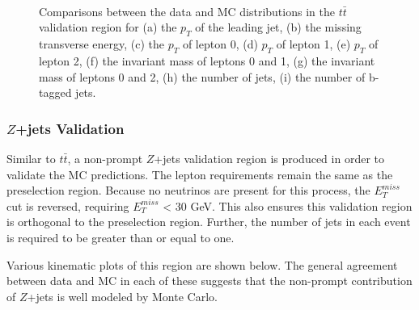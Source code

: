 \begin{figure}[H]
    \centering
    \\
    \\
    \\
    \caption{Comparisons between the data and MC distributions in the $t\bar{t}$ validation region for (a) the $p_T$ of the leading jet, (b) the missing transverse energy, (c) the $p_T$ of lepton 0, (d) $p_T$ of lepton 1, (e) $p_T$ of lepton 2, (f) the invariant mass of leptons 0 and 1, (g) the invariant mass of leptons 0 and 2, (h) the number of jets, (i) the number of b-tagged jets.}
    \label{ttbar_kinematics}
\end{figure}

\subsubsection{$Z$+jets Validation}

Similar to $t\bar{t}$, a non-prompt $Z$+jets validation region is produced in order to validate the MC predictions. The lepton requirements remain the same as the preselection region. Because no neutrinos are present for this process, the $E_T^{miss}$ cut is reversed, requiring $E_T^{miss}$ < 30 GeV. This also ensures this validation region is orthogonal to the preselection region. Further, the number of jets in each event is required to be greater than or equal to one. 

Various kinematic plots of this region are shown below. The general agreement between data and MC in each of these suggests that the non-prompt contribution of $Z$+jets is well modeled by Monte Carlo.

